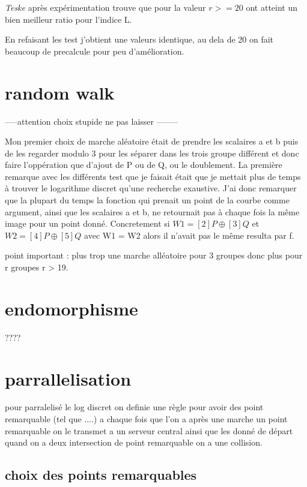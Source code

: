 \documentclass[a4paper,10pt]{report}
\begin{document}
\textit{Teske} après expérimentation trouve que pour la valeur $r >= 20$ ont atteint un bien meilleur ratio pour l'indice L.

En refaisant les test j'obtient une valeurs identique, au dela de 20 on fait beaucoup de precalcule pour peu d'amélioration.

\chapter{random walk}

-----attention choix stupide ne pas laisser --------

Mon premier choix de marche aléatoire était de prendre les scalaires a et b puis de les regarder modulo 3 pour les séparer dans les 
trois groupe différent et donc faire l'oppération que d'ajout de P ou de Q, ou le doublement.
La première remarque avec les différents test que je faisait était que je mettait plus de temps à trouver le logarithme discret
qu'une recherche exaustive. J'ai donc remarquer que la plupart du temps la fonction qui prenait un point de la courbe comme argument,
ainsi que les scalaires a et b, ne retournait pas à chaque fois la même image pour un point donné. Concretement si 
$W1 = [2]P \oplus [3]Q$ et $W2 = [4]P \oplus [5]Q$ avec W1 = W2 alors il n'avait pas le même resulta par f.

point important : plus trop une marche alléatoire pour 3 groupes donc plus pour r groupes r > 19.

\chapter{endomorphisme}
 
 ????

\chapter{parrallelisation}

pour parralelisé le log discret on definie une règle pour avoir des point remarquable (tel que ....) 
a chaque fois que l'on a après une marche un point remarquable on le transmet a un serveur central ainsi que les donné de départ
quand on  a deux intersection de point remarquable on a une collision.

\section{choix des points remarquables}
\end{document}
